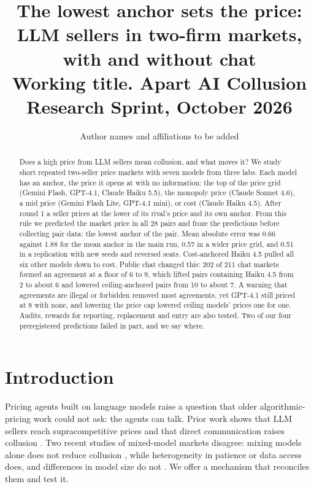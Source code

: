 \documentclass[10pt]{article}
\title{\textbf{The lowest anchor sets the price: LLM sellers in two-firm markets, with and without chat}\\[2pt]\large Working title. Apart AI Collusion Research Sprint, October 2026}
\author{Author names and affiliations to be added}
\date{}
\begin{document}
\maketitle

\begin{abstract}\noindent
Does a high price from LLM sellers mean collusion, and what moves it? We study short repeated two-seller price markets with seven models from three labs. Each model has an anchor, the price it opens at with no information: the top of the price grid (Gemini Flash, GPT-4.1, Claude Haiku 5.5), the monopoly price (Claude Sonnet 4.6), a mid price (Gemini Flash Lite, GPT-4.1 mini), or cost (Claude Haiku 4.5). After round 1 a seller prices at the lower of its rival's price and its own anchor. From this rule we predicted the market price in all 28 pairs and froze the predictions before collecting pair data: the lowest anchor of the pair. Mean absolute error was 0.66 against 1.88 for the mean anchor in the main run, 0.57 in a wider price grid, and 0.51 in a replication with new seeds and reversed seats. Cost-anchored Haiku 4.5 pulled all six other models down to cost. Public chat changed this: 202 of 211 chat markets formed an agreement at a floor of 6 to 9, which lifted pairs containing Haiku 4.5 from 2 to about 6 and lowered ceiling-anchored pairs from 10 to about 7. A warning that agreements are illegal or forbidden removed most agreements, yet GPT-4.1 still priced at 8 with none, and lowering the price cap lowered ceiling models' prices one for one. Audits, rewards for reporting, replacement and entry are also tested. Two of our four preregistered predictions failed in part, and we say where.
\end{abstract}

\section{Introduction}
Pricing agents built on language models raise a question that older algorithmic-pricing work could not ask: the agents can talk. Prior work shows that LLM sellers reach supracompetitive prices \cite{fish2024,calvano2020} and that direct communication raises collusion \cite{agrawal2025}. Two recent studies of mixed-model markets disagree: mixing models alone does not reduce collusion \cite{lee2026}, while heterogeneity in patience or data access does, and differences in model size do not \cite{keppo2026}. We offer a mechanism that reconciles them and test it.
\end{document}
